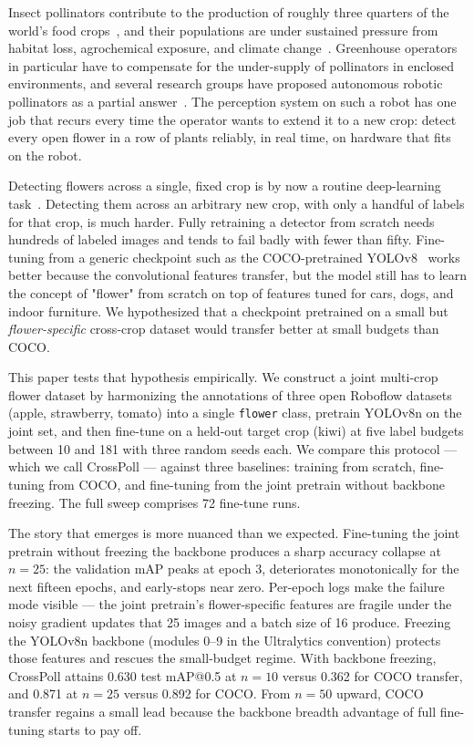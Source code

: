 Insect pollinators contribute to the production of roughly three quarters of the world's food crops~\cite{klein2007pollinators}, and their populations are under sustained pressure from habitat loss, agrochemical exposure, and climate change~\cite{potts2010decline}. Greenhouse operators in particular have to compensate for the under-supply of pollinators in enclosed environments, and several research groups have proposed autonomous robotic pollinators as a partial answer~\cite{strader2019pollination}. The perception system on such a robot has one job that recurs every time the operator wants to extend it to a new crop: detect every open flower in a row of plants reliably, in real time, on hardware that fits on the robot.

Detecting flowers across a single, fixed crop is by now a routine deep-learning task~\cite{dias2018apple, tian2019apple, genemola2020fruit}. Detecting them across an arbitrary new crop, with only a handful of labels for that crop, is much harder. Fully retraining a detector from scratch needs hundreds of labeled images and tends to fail badly with fewer than fifty. Fine-tuning from a generic checkpoint such as the COCO-pretrained YOLOv8~\cite{lin2014coco, jocher2023ultralytics} works better because the convolutional features transfer, but the model still has to learn the concept of "flower" from scratch on top of features tuned for cars, dogs, and indoor furniture. We hypothesized that a checkpoint pretrained on a small but \emph{flower-specific} cross-crop dataset would transfer better at small budgets than COCO.

This paper tests that hypothesis empirically. We construct a joint multi-crop flower dataset by harmonizing the annotations of three open Roboflow datasets (apple, strawberry, tomato) into a single \texttt{flower} class, pretrain YOLOv8n on the joint set, and then fine-tune on a held-out target crop (kiwi) at five label budgets between 10 and 181 with three random seeds each. We compare this protocol --- which we call CrossPoll --- against three baselines: training from scratch, fine-tuning from COCO, and fine-tuning from the joint pretrain without backbone freezing. The full sweep comprises 72 fine-tune runs.

The story that emerges is more nuanced than we expected. Fine-tuning the joint pretrain without freezing the backbone produces a sharp accuracy collapse at $n{=}25$: the validation mAP peaks at epoch 3, deteriorates monotonically for the next fifteen epochs, and early-stops near zero. Per-epoch logs make the failure mode visible --- the joint pretrain's flower-specific features are fragile under the noisy gradient updates that 25 images and a batch size of 16 produce. Freezing the YOLOv8n backbone (modules 0--9 in the Ultralytics convention) protects those features and rescues the small-budget regime. With backbone freezing, CrossPoll attains 0.630 test mAP@0.5 at $n{=}10$ versus 0.362 for COCO transfer, and 0.871 at $n{=}25$ versus 0.892 for COCO. From $n{=}50$ upward, COCO transfer regains a small lead because the backbone breadth advantage of full fine-tuning starts to pay off.

